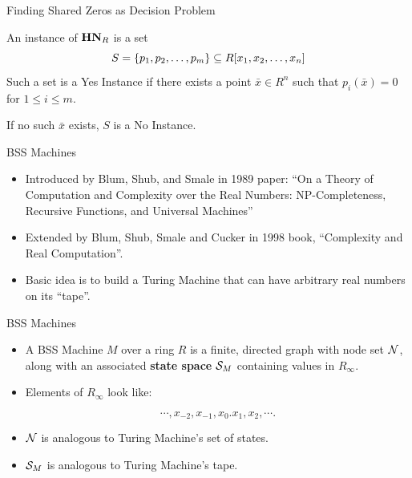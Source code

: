 \documentclass[c]{beamer}
\begin{document}
\begin{frame}{Finding Shared Zeros as Decision Problem}

  An instance of $\mathbf{HN}_R$ is a set 
  $$S = \{p_1, p_2, \ldots, p_m\} \subseteq R[x_1, x_2,\ldots,x_n]$$ 
  Such a set is a Yes Instance if there exists a point $\bar{x} \in
  R^n$ such that $p_i(\bar{x}) = 0$ for $1 \leq i \leq m$.

  \vspace{\baselineskip}
  
  If no such $\bar{x}$ exists, $S$ is a No Instance.
  
\end{frame}

\begin{frame}{BSS Machines}

  \begin{itemize}
  \item[] Introduced by Blum, Shub, and Smale in 1989 paper:
    ``On a Theory of Computation and Complexity over the Real Numbers:
    NP-Completeness, Recursive Functions, and Universal Machines''

    \vspace{\baselineskip}

  \item[] Extended by Blum, Shub, Smale and Cucker in 1998 book,
    ``Complexity and Real Computation''.

    \vspace{\baselineskip}

  \item[] Basic idea is to build a Turing Machine that can have
    arbitrary real numbers on its ``tape''.
  \end{itemize}
\end{frame}

\begin{frame}{BSS Machines}

  \begin{itemize}
  \item[] A BSS Machine $M$ over a ring $R$ is a finite, directed graph
    with node set $\mathcal{N}$, along with an associated \textbf{state
      space} $\mathcal{S}_M$ containing values in $R_\infty$.\pause

    \vspace{\baselineskip}

  \item[] Elements of $R_\infty$ look like:
    
    \vspace{-.8\baselineskip}
    
    $$\cdots, x_{-2}, x_{-1}, x_0 . x_1, x_2, \cdots.$$
    
  \item[] $\mathcal{N}$ is analogous to Turing Machine's set of
    states.
  \item[] $\mathcal{S}_M$ is analogous to Turing Machine's tape.
  \end{itemize}

\end{frame}
\end{document}
